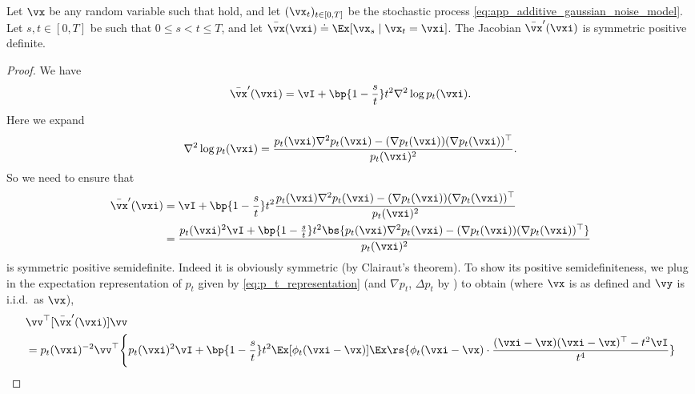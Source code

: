 \documentclass[../../book-main.tex]{subfiles}
\begin{document}
\begin{lemma}\label{lem:gribonval_A1}
    Let \(\vx\) be any random variable such that
    hold, and let \((\vx_{t})_{t \in [0, T]}\) be the stochastic
    process \eqref{eq:app_additive_gaussian_noise_model}. Let \(s, t
    \in [0, T]\) be such that \(0 \leq s < t \leq T\), and let
    \(\bar{\vx}(\vxi) \doteq \Ex[\vx_{s} \mid \vx_{t} = \vxi]\). The
    Jacobian \(\bar{\vx}^{\prime}(\vxi)\) is symmetric positive definite.
\end{lemma}
\begin{proof}
    We have
    \begin{equation}
        \bar{\vx}^{\prime}(\vxi) = \vI + \bp{1 -
        \frac{s}{t}}t^{2}\nabla^{2}\log p_{t}(\vxi).
    \end{equation}
    Here we expand
    \begin{equation}
        \nabla^{2}\log p_{t}(\vxi) =
        \frac{p_{t}(\vxi)\nabla^{2}p_{t}(\vxi) - (\nabla
        p_{t}(\vxi))(\nabla p_{t}(\vxi))^{\top}}{p_{t}(\vxi)^{2}}.
    \end{equation}
    So we need to ensure that
    \begin{align}
        \bar{\vx}^{\prime}(\vxi)
        &= \vI + \bp{1 -
        \frac{s}{t}}t^{2}\frac{p_{t}(\vxi)\nabla^{2}p_{t}(\vxi) -
        (\nabla p_{t}(\vxi))(\nabla p_{t}(\vxi))^{\top}}{p_{t}(\vxi)^{2}} \\
        &= \frac{p_{t}(\vxi)^{2}\vI + \bp{1 -
            \frac{s}{t}}t^{2}\bs{p_{t}(\vxi)\nabla^{2}p_{t}(\vxi) -
        (\nabla p_{t}(\vxi))(\nabla p_{t}(\vxi))^{\top}}}{p_{t}(\vxi)^{2}}
    \end{align}
    is symmetric positive semidefinite. Indeed it is obviously
    symmetric (by Clairaut's theorem). To show its positive
    semidefiniteness, we plug in the expectation representation of
    \(p_{t}\) given by \eqref{eq:p_t_representation} (and \(\nabla
    p_{t}\), \(\Delta p_{t}\) by ) to
    obtain (where \(\vx\) is as defined and \(\vy\) is i.i.d.~as \(\vx\)),
    \begin{align}
        &\vv^{\top}[\bar{\vx}^{\prime}(\vxi)]\vv \\
        &= p_{t}(\vxi)^{-2}\vv^{\top}\Bigg\{p_{t}(\vxi)^{2}\vI +
            \bp{1 - \frac{s}{t}}t^{2}\Ex[\phi_{t}(\vxi -
            \vx)]\Ex\rs{\phi_{t}(\vxi - \vx)\cdot\frac{(\vxi -
            \vx)(\vxi - \vx)^{\top} - t^{2}\vI}{t^{4}}} \\

\end{align}
\end{proof}
\end{document}
